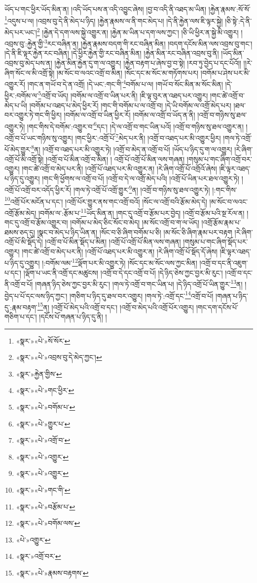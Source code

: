 ཡོད་པ་གང་ཕྱིར་ཡོད་མིན་ན། །འདི་ཡོད་པས་ན་འདི་འབྱུང་ཞེས། །བྱ་བ་འདི་ནི་འཐད་མ་ཡིན། །རྐྱེན་རྣམས་:སོ་སོ་\footnote{«སྣར་»«པེ་»སོ་སོར་}འདུས་པ་ལ། །འབྲས་བུ་དེ་ནི་མེད་པ་ཉིད། །རྐྱེན་རྣམས་ལ་ནི་གང་མེད་པ། །དེ་ནི་རྐྱེན་ལས་ཇི་ལྟར་སྐྱེ། །ཅི་སྟེ་:དེ་ནི་མེད་པར་ཡང་།\footnote{«སྣར་»«པེ་»འབྲས་བུ་དེ་མེད་ཀྱང་།} །རྐྱེན་དེ་དག་ལས་སྐྱེ་འགྱུར་ན། །རྐྱེན་མ་ཡིན་པ་དག་ལས་ཀྱང་། །ཅི་ཡི་ཕྱིར་ན་སྐྱེ་མི་འགྱུར། །འབྲས་བུ་:རྐྱེན་གྱི་\footnote{«སྣར་»རྐྱེན་གྱིས་}རང་བཞིན་ན། །རྐྱེན་རྣམས་བདག་གི་རང་བཞིན་མིན། །བདག་དངོས་མིན་ལས་འབྲས་བུ་གང་། །དེ་ནི་ཇི་ལྟར་རྐྱེན་རང་བཞིན། །དེ་ཕྱིར་རྐྱེན་གྱི་རང་བཞིན་མིན། །རྐྱེན་མིན་རང་བཞིན་འབྲས་བུ་ནི། །ཡོད་མིན་འབྲས་བུ་མེད་པས་ན། །རྐྱེན་མིན་རྐྱེན་དུ་ག་ལ་འགྱུར། །རྐྱེན་བརྟག་པ་ཞེས་བྱ་བ་སྟེ། །རབ་ཏུ་བྱེད་པ་དང་པོའོ།། །།རེ་ཞིག་སོང་ལ་མི་འགྲོ་སྟེ། །མ་སོང་བ་ལའང་འགྲོ་བ་མིན། །སོང་དང་མ་སོང་མ་གཏོགས་པར། །བགོམ་པ་ཤེས་པར་མི་འགྱུར་རོ། །གང་ན་གཡོ་བ་དེ་ན་འགྲོ། །དེ་ཡང་:གང་གི་\footnote{«སྣར་»«པེ་»གང་ཕྱིར་}བགོམ་པ་ལ། །གཡོ་བ་སོང་མིན་མ་སོང་མིན། །དེ་ཕྱིར་:བགོམ་ལ་\footnote{«སྣར་»«པེ་»བགོམ་པ་}འགྲོ་བ་ཡོད། །བགོམ་ལ་འགྲོ་བ་ཡིན་པར་ནི། །ཇི་ལྟ་བུར་ན་འཐད་པར་འགྱུར། །གང་ཚེ་འགྲོ་བ་མེད་པ་ཡི། །བགོམ་པ་འཐད་པ་མེད་ཕྱིར་རོ། །གང་གི་བགོམ་པ་ལ་འགྲོ་བ། །དེ་ཡི་བགོམ་ལ་འགྲོ་མེད་པར། །ཐལ་བར་འགྱུར་ཏེ་གང་གི་ཕྱིར། །བགོམ་ལ་འགྲོ་བ་ཡིན་ཕྱིར་རོ། །བགོམ་ལ་འགྲོ་བ་ཡོད་ན་ནི། །འགྲོ་བ་གཉིས་སུ་ཐལ་འགྱུར་ཏེ། །གང་གིས་དེ་བགོམ་:འགྱུར་བ་\footnote{«སྣར་»«པེ་»གྱུར་པ་}དང་། །དེ་ལ་འགྲོ་བ་གང་ཡིན་པའོ། །འགྲོ་བ་གཉིས་སུ་ཐལ་འགྱུར་ན། །འགྲོ་བ་པོ་ཡང་གཉིས་སུ་འགྱུར། །གང་ཕྱིར་:འགྲོ་པོ་\footnote{«སྣར་»«པེ་»འགྲོ་བ་}མེད་པར་ནི། །འགྲོ་བ་འཐད་པར་མི་འགྱུར་ཕྱིར། །གལ་ཏེ་འགྲོ་པོ་མེད་གྱུར་\footnote{«སྣར་»«པེ་»འགྱུར་}ན། །འགྲོ་བ་འཐད་པར་མི་འགྱུར་ཏེ། །འགྲོ་བ་མེད་ན་འགྲོ་བ་པོ། །ཡོད་པ་ཉིད་དུ་ག་ལ་འགྱུར། །རེ་ཞིག་འགྲོ་པོ་མི་འགྲོ་སྟེ། །འགྲོ་བ་པོ་མིན་འགྲོ་བ་མིན། །
འགྲོ་པོ་འགྲོ་པོ་མིན་ལས་གཞན། །གསུམ་པ་གང་ཞིག་འགྲོ་བར་འགྱུར། །གང་ཚེ་འགྲོ་བ་མེད་པར་ནི། །འགྲོ་པོ་འཐད་པར་མི་འགྱུར་ན། །རེ་ཞིག་འགྲོ་པོ་འགྲོའོ་ཞེས། །ཇི་ལྟར་འཐད་པ་ཉིད་དུ་འགྱུར། །གང་གི་ཕྱོགས་ལ་འགྲོ་བ་པོ། །འགྲོ་བ་དེ་ལ་འགྲོ་མེད་པའི། །འགྲོ་པོ་ཡིན་པར་ཐལ་འགྱུར་ཏེ། །འགྲོ་པོ་འགྲོ་བར་འདོད་ཕྱིར་རོ། །གལ་ཏེ་འགྲོ་པོ་འགྲོ་གྱུར་\footnote{«སྣར་»«པེ་»འགྱུར་}ན། །འགྲོ་བ་གཉིས་སུ་ཐལ་འགྱུར་ཏེ། །:གང་གིས་\footnote{«སྣར་»«པེ་»གང་གི་}འགྲོ་པོར་མངོན་པ་དང་། །འགྲོ་པོར་གྱུར་ནས་གང་འགྲོ་བའོ། །སོང་ལ་འགྲོ་བའི་རྩོམ་མེད་དེ། །མ་སོང་བ་ལའང་འགྲོ་རྩོམ་མེད། །བགོམ་ལ་:རྩོམ་པ་\footnote{«སྣར་»«པེ་»བརྩོམ་པ་}ཡོད་མིན་ན། །གང་དུ་འགྲོ་བ་རྩོམ་པར་བྱེད། །འགྲོ་བ་རྩོམ་པའི་སྔ་རོལ་ན། །གང་དུ་འགྲོ་བ་རྩོམ་འགྱུར་བ། །བགོམ་པ་མེད་ཅིང་སོང་བ་མེད། །མ་སོང་འགྲོ་བ་ག་ལ་ཡོད། །འགྲོ་རྩོམ་རྣམ་པ་ཐམས་ཅད་དུ། །སྣང་བ་མེད་པ་ཉིད་ཡིན་ན། །སོང་བ་ཅི་ཞིག་བགོམ་པ་ཅི། །མ་སོང་ཅི་ཞིག་རྣམ་པར་བརྟག །རེ་ཞིག་འགྲོ་པོ་མི་སྡོད་དེ། །འགྲོ་བ་པོ་མིན་སྡོད་པ་མིན། །འགྲོ་པོ་འགྲོ་པོ་མིན་ལས་གཞན། །གསུམ་པ་གང་ཞིག་སྡོད་པར་འགྱུར། །གང་ཚེ་འགྲོ་བ་མེད་པར་ནི། །འགྲོ་པོ་འཐད་པར་མི་འགྱུར་ན། །རེ་ཞིག་འགྲོ་པོ་སྡོད་དོ་ཞེས། །ཇི་ལྟར་འཐད་པ་ཉིད་དུ་འགྱུར། །:བགོམ་ལམ་\footnote{«སྣར་»«པེ་»བགོམ་ལས་}ལྡོག་པར་མི་འགྱུར་ཏེ། །སོང་དང་མ་སོང་ལས་ཀྱང་མིན། །འགྲོ་བ་དང་ནི་འཇུག་པ་དང་། །ལྡོག་པ་ཡང་ནི་འགྲོ་དང་མཚུངས། །འགྲོ་བ་དེ་དང་འགྲོ་བ་པོ། །དེ་ཉིད་ཅེས་ཀྱང་བྱར་མི་རུང་། །འགྲོ་བ་དང་ནི་འགྲོ་བ་པོ། །གཞན་ཉིད་ཅེས་ཀྱང་བྱར་མི་རུང་། །གལ་ཏེ་འགྲོ་བ་གང་ཡིན་པ། །དེ་ཉིད་འགྲོ་པོ་ཡིན་གྱུར་\footnote{«པེ་»འགྱུར་}ན། །བྱེད་པ་པོ་དང་ལས་ཉིད་ཀྱང་། །གཅིག་པ་ཉིད་དུ་ཐལ་བར་འགྱུར། །གལ་ཏེ་:འགྲོ་དང་\footnote{«སྣར་»འགྲོ་བར་}འགྲོ་བ་པོ། །གཞན་པ་ཉིད་དུ་:རྣམ་བརྟག་\footnote{«སྣར་»«པེ་»རྣམས་བརྟགས་}ན། །འགྲོ་པོ་མེད་པའི་འགྲོ་བ་དང་། །འགྲོ་བ་མེད་པའི་འགྲོ་པོར་འགྱུར། །གང་དག་དངོས་པོ་གཅིག་པ་དང་། །དངོས་པོ་གཞན་པ་ཉིད་དུ་ནི། །
